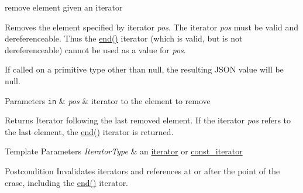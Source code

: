 remove element given an iterator 

Removes the element specified by iterator {\itshape pos}. The iterator {\itshape pos} must be valid and dereferenceable. Thus the {\ttfamily \hyperlink{classnlohmann_1_1basic__json_a13e032a02a7fd8a93fdddc2fcbc4763c}{end()}} iterator (which is valid, but is not dereferenceable) cannot be used as a value for {\itshape pos}.

If called on a primitive type other than {\ttfamily null}, the resulting J\+S\+ON value will be {\ttfamily null}.


\begin{DoxyParams}[1]{Parameters}
\mbox{\tt in}  & {\em pos} & iterator to the element to remove \\
\hline
\end{DoxyParams}
\begin{DoxyReturn}{Returns}
Iterator following the last removed element. If the iterator {\itshape pos} refers to the last element, the {\ttfamily \hyperlink{classnlohmann_1_1basic__json_a13e032a02a7fd8a93fdddc2fcbc4763c}{end()}} iterator is returned.
\end{DoxyReturn}

\begin{DoxyTemplParams}{Template Parameters}
{\em Iterator\+Type} & an \hyperlink{classnlohmann_1_1basic__json_a099316232c76c034030a38faa6e34dca}{iterator} or \hyperlink{classnlohmann_1_1basic__json_a41a70cf9993951836d129bb1c2b3126a}{const\+\_\+iterator}\\
\hline
\end{DoxyTemplParams}
\begin{DoxyPostcond}{Postcondition}
Invalidates iterators and references at or after the point of the erase, including the {\ttfamily \hyperlink{classnlohmann_1_1basic__json_a13e032a02a7fd8a93fdddc2fcbc4763c}{end()}} iterator.
\end{DoxyPostcond}


